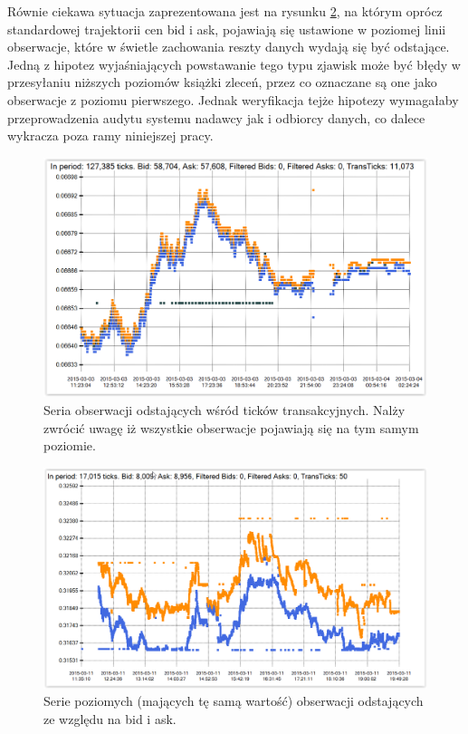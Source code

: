\documentclass[a4paper,12pt,openany, DIV=calc, headsepline]{scrbook}
\begin{document}
Równie ciekawa sytuacja zaprezentowana jest na rysunku \ref{fig:f6LJ15Row}, na którym oprócz standardowej trajektorii cen bid i ask, pojawiają się ustawione w poziomej linii obserwacje, które w świetle zachowania reszty danych wydają się być odstające. Jedną z hipotez wyjaśniających powstawanie tego typu zjawisk może być błędy w przesyłaniu niższych poziomów książki zleceń, przez co oznaczane są one jako obserwacje z poziomu pierwszego. Jednak weryfikacja tejże hipotezy wymagałaby przeprowadzenia audytu systemu nadawcy jak i odbiorcy danych, co dalece wykracza poza ramy niniejszej pracy.

\begin{figure}[H]
  \centering
  \includegraphics[scale=0.5]{wykresy/f6mh15.PNG}
  \caption{Seria obserwacji odstających wśród ticków transakcyjnych. Nalży zwrócić uwagę iż wszystkie obserwacje pojawiają się na tym samym poziomie.}
  \label{fig:f6mh15}
\end{figure}

\begin{figure}[H]
  \centering
  \includegraphics[scale=0.5]{wykresy/f6LJ15Row.PNG}
  \caption{Serie poziomych (mających tę samą wartość) obserwacji odstających ze względu na bid i ask.}
  \label{fig:f6LJ15Row}
\end{figure}
\end{document}
